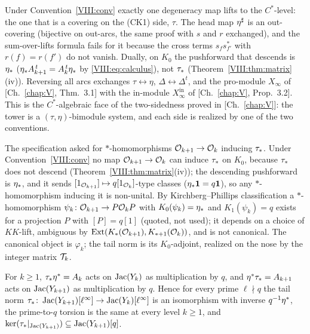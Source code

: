 \begin{remark}\label{VIII:rem:mirror}
Under Convention~\ref{VIII:conv} exactly one degeneracy map lifts to the $C^*$-level: the one
that is a covering on the (CK1) side, $\tau$. The head map ${\eta}^{\sharp}$ is an
out-covering (bijective on out-arcs, the same proof with $s$ and $r$ exchanged), and the
sum-over-lifts formula fails for it because the cross terms $s_fs_{f'}^*$ with $r(f)=r(f')$
do not vanish. Dually, on $K_0$ the pushforward that descends is $\eta_*$
($\eta_* A_{k+1}^{\,t}=A_k^{\,t}\eta_*$ by \eqref{VIII:eq:calculus}), not $\tau_*$
(Theorem~\ref{VIII:thm:matrix}(iv)). Reversing all arcs exchanges $\tau\leftrightarrow\eta$,
$\Delta\leftrightarrow\Delta^{t}$, and the pro-module $X_\infty$ of [Ch.~\ref{chap:V}, Thm.~3.1] with
the in-module $X_\infty^{\mathrm{in}}$ of [Ch.~\ref{chap:V}, Prop.~3.2]. This is the $C^*$-algebraic
face of the two-sidedness proved in [Ch.~\ref{chap:V}]: the tower is a $(\tau,\eta)$-bimodule system,
and each side is realized by one of the two conventions.
\end{remark}

\begin{remark}\label{VIII:rem:down}
The specification asked for $*$-homomorphisms $\mathcal{O}_{k+1}\to\mathcal{O}_k$ inducing $\tau_*$. Under
Convention~\ref{VIII:conv} no map $\mathcal{O}_{k+1}\to\mathcal{O}_k$ can induce $\tau_*$ on $K_0$, because $\tau_*$
does not descend (Theorem~\ref{VIII:thm:matrix}(iv)); the descending pushforward is $\eta_*$,
and it sends $[1_{\mathcal{O}_{k+1}}]\mapsto q[1_{\mathcal{O}_k}]$-type classes ($\eta_*\mathbf1=q\mathbf1$),
so any $*$-homomorphism inducing it is non-unital. By Kirchberg--Phillips
classification \cite{Ph} a $*$-homomorphism $\psi_k\colon\mathcal{O}_{k+1}\to P\mathcal{O}_kP$ with
$K_0(\psi_k)=\eta_*$ and $K_1(\psi_k)=q$ exists for a projection $P$ with
$[P]=q[1]$ (quoted, not used); it depends on a choice of $KK$-lift, ambiguous by
$\operatorname{Ext}(K_*(\mathcal{O}_{k+1}),K_{*+1}(\mathcal{O}_k))$, and is not canonical. The canonical object is
$\varphi_k$; the tail norm is its $K_0$-adjoint, realized on the nose by the integer
matrix $\mathcal{T}_{k}$.
\end{remark}

\begin{proposition}\label{VIII:prop:stable}
For $k\ge1$, $\tau_*\eta^*=A_k$ acts on $\operatorname{Jac}(Y_k)$ as multiplication by $q$, and
$\eta^*\tau_*=A_{k+1}$ acts on $\operatorname{Jac}(Y_{k+1})$ as multiplication by $q$. Hence for every
prime $\ell\nmid q$ the tail norm $\tau_*\colon\operatorname{Jac}(Y_{k+1})[\ell^\infty]\to\operatorname{Jac}(Y_k)[\ell^\infty]$
is an isomorphism with inverse $q^{-1}\eta^*$, the prime-to-$q$ torsion is the same at
every level $k\ge1$, and $\ker(\tau_*|_{\operatorname{Jac}(Y_{k+1})})\subseteq\operatorname{Jac}(Y_{k+1})[q]$.
\end{proposition}

